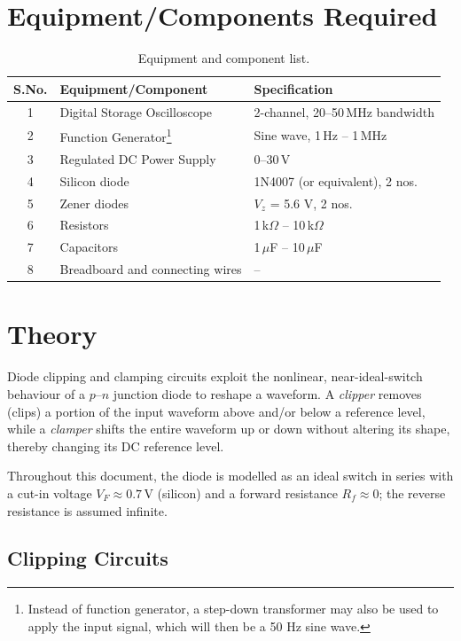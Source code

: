 \section{Equipment/Components Required}
\begin{table}[h!]
	\centering
	\begin{tabular}{@{}cll@{}}
		\toprule
		S.No. & Equipment/Component & Specification \\
		\midrule
		1 & Digital Storage Oscilloscope & 2-channel, 20--50\,MHz bandwidth \\
		2 & Function Generator\footnote{Instead of function generator, a step-down transformer may also be used to apply the input signal, which will then be a 50 Hz sine wave.} & Sine wave, 1\,Hz -- 1\,MHz \\
		3 & Regulated DC Power Supply & 0--30\,V \\
		4 & Silicon diode & 1N4007 (or equivalent), 2 nos. \\
		5 & Zener diodes & $V_z$ = 5.6 V, 2 nos. \\
		6 & Resistors & 1\,k$\Omega$ -- 10\,k$\Omega$ \\
		7 & Capacitors & 1\,$\mu$F -- 10\,$\mu$F \\
		8 & Breadboard and connecting wires & -- \\
		\bottomrule
	\end{tabular}
	\caption{Equipment and component list.}
\end{table}

\section{Theory}

Diode clipping and clamping circuits exploit the nonlinear, near-ideal-switch behaviour of a $p$--$n$ junction diode to reshape a waveform. A \emph{clipper} removes (clips) a portion of the input waveform above and/or below a reference level, while a \emph{clamper} shifts the entire waveform up or down without altering its shape, thereby changing its DC reference level.

Throughout this document, the diode is modelled as an ideal switch in series with a cut-in voltage $V_F \approx 0.7\,\text{V}$ (silicon) and a forward resistance $R_f \approx 0$; the reverse resistance is assumed infinite.

\subsection{Clipping Circuits}


